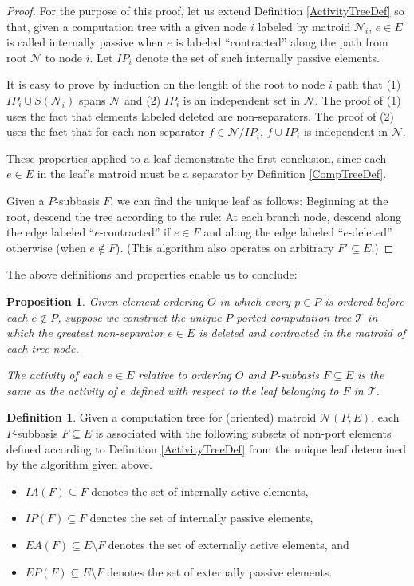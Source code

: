 \documentclass[12pt]{article}
\newtheorem{proposition}[theorem]{Proposition}
\theoremstyle{definition}
\newtheorem{definition}[theorem]{Definition}
\begin{document}
\begin{proof}
For the purpose of this proof, let us extend Definition \ref{ActivityTreeDef}
so that, given a computation tree with a given node $i$ 
labeled by matroid $\mathcal{N}_i$,
$e\in E$ is called internally passive when $e$ is labeled 
``contracted'' along the path from root $\mathcal{N}$ to
node $i$.  Let $IP_i$ denote the set of such internally passive 
elements.

It is easy to prove by induction on the length of the root to node $i$ path
that
(1) $IP_i\cup S(\mathcal{N}_i)$ spans $\mathcal{N}$ and 
(2) $IP_i$ is an independent set in $\mathcal{N}$.  The proof
of (1) uses the fact that elements labeled deleted are non-separators.  The
proof of (2) uses the fact that for each non-separator 
$f\in\mathcal{N}/IP_i$, $f\cup IP_i$ is independent in $\mathcal{N}$.

These properties applied to a leaf demonstrate the first conclusion,
since each $e\in E$ in the leaf's matroid must be a separator by Definition 
\ref{CompTreeDef}.

Given a $P$-subbasis $F$, we can find the unique leaf as follows: Beginning
at the root, descend the tree according to the rule: At each branch node,
descend along the edge labeled ``$e$-contracted'' if $e\in F$ and along
the edge labeled ``$e$-deleted'' otherwise (when $e\not\in F$).
(This algorithm also operates on arbitrary $F'\subseteq E$.)
\end{proof}

The above definitions and properties enable us to conclude:
\begin{proposition}
Given element ordering $O$ in which every $p\in P$ is ordered
before each $e\not\in P$, suppose we construct the unique $P$-ported
computation tree $\mathcal{T}$ in which the greatest non-separator $e\in E$ is
deleted and contracted in the matroid of each tree node.

The activity of each $e\in E$ relative to ordering $O$ and
$P$-subbasis $F\subseteq E$ is the same as the activity
of $e$ defined with respect to the leaf 
belonging to $F$ in $\mathcal{T}$.
\end{proposition}

\begin{definition}
\label{ActivitySymbolsDef}
Given a computation tree for 
(oriented) matroid $\mathcal{N}(P,E)$,
each $P$-subbasis $F\subseteq E$
is associated with the following subsets of non-port elements
defined according to Definition \ref{ActivityTreeDef}
from the unique leaf determined by the algorithm given above.
\begin{itemize}
\item $IA(F)\subseteq F$ denotes the set of internally active elements,
\item $IP(F)\subseteq F$ denotes the set of internally passive elements,
\item $EA(F)\subseteq E\setminus F$ 
denotes the set of externally active elements,
and 
\item $EP(F)\subseteq E\setminus F$ denotes the set of externally
passive elements.
\end{itemize}
\end{definition}
\end{document}
